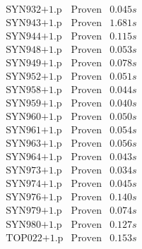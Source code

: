 \documentclass[a4paper,11pt]{report}
\theoremstyle{definition}
\theoremstyle{definition}
\theoremstyle{definition}
\theoremstyle{definition}
\theoremstyle{definition}
\theoremstyle{definition}
\theoremstyle{definition}
\begin{document}
\begin{minipage}{0.45\textwidth}
\[\begin{matrix}
			\text{SYN932+1.p}&\text{Proven}& 0.045 s\\
			\text{SYN943+1.p}&\text{Proven}& 1.681 s\\
			\text{SYN944+1.p}&\text{Proven}& 0.115 s\\
			\text{SYN948+1.p}&\text{Proven}& 0.053 s\\
			\text{SYN949+1.p}&\text{Proven}& 0.078 s\\
			\text{SYN952+1.p}&\text{Proven}& 0.051 s\\
			\text{SYN958+1.p}&\text{Proven}& 0.044 s\\
			\text{SYN959+1.p}&\text{Proven}& 0.040 s\\
			\text{SYN960+1.p}&\text{Proven}& 0.050 s\\
			\text{SYN961+1.p}&\text{Proven}& 0.054 s\\
			\text{SYN963+1.p}&\text{Proven}& 0.056 s\\
			\text{SYN964+1.p}&\text{Proven}& 0.043 s\\
			\text{SYN973+1.p}&\text{Proven}& 0.034 s\\
			\text{SYN974+1.p}&\text{Proven}& 0.045 s\\
			\text{SYN976+1.p}&\text{Proven}& 0.140 s\\
			\text{SYN979+1.p}&\text{Proven}& 0.074 s\\
			\text{SYN980+1.p}&\text{Proven}& 0.127 s\\
			\text{TOP022+1.p}&\text{Proven}& 0.153 s\\
		\end{matrix}\]
	\end{minipage}

	\restoregeometry						
	
	
	

	\pagebreak
		
	\
	\newpage
	
\end{document}
